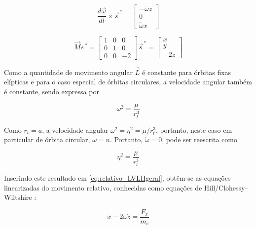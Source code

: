 \begin{equation}
\label{eq:dOmega_cross_s}
\frac{d\vec\omega}{dt} \times \vec s^{\,*} 
=
\begin{bmatrix}
-\dot\omega z \\
0              \\
\dot\omega x
\end{bmatrix}
\end{equation}

\begin{equation}
\label{eq:jacobiana_LVLH}
\vec{M}s^{\,*} 
=
\begin{bmatrix}
    1 & 0 & 0 \\
    0 & 1 & 0  \\
    0 & 0 & -2
\end{bmatrix}
\vec s^{\,*} 
=
\begin{bmatrix}
x \\
y \\
-2z
\end{bmatrix}
\end{equation}


Como a quantidade de movimento angular $\vec{L}$ é constante para órbitas fixas elípticas e para o caso especial de órbitas circulares, a velocidade angular também é constante, sendo expressa por 

\begin{equation}
\label{eq:omega_constante1}
\omega^2 = \frac{\mu}{r_t^3}
\end{equation}

Como $r_t=a$, a velocidade angular $\omega^{2}= \eta^2 = \mu/r_t^{3}$, portanto, neste caso em particular de órbita circular, $\omega=n$.
Portanto, $\dot{\omega}=0$, pode ser reescrita como

\begin{equation}
\label{eq:omega_constante2}
\eta^2 = \frac{\mu}{r_t^3}
\end{equation}

Inserindo este resultado em \eqref{eq:relativo_LVLHgeral}, obtêm-se as equações linearizadas do movimento relativo, conhecidas como equações de Hill/Clohessy--Wiltshire \cite{hill1878,fehse2003,wie2008space}:

\begin{equation}
    \label{eq:equacoes_HillX}
\ddot{x} - 2\omega \dot{z} = \frac{F_x}{m_c}
\end{equation}

